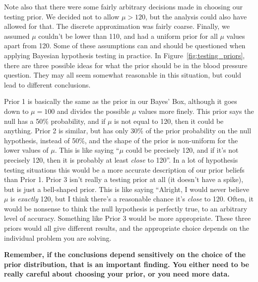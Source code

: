 Note also that there were some fairly arbitrary decisions made in choosing our
testing prior. We decided not to allow $\mu > 120$, but the analysis could
also have allowed for that. The discrete approximation was fairly coarse. Finally, we
assumed $\mu$ couldn't be lower than 110, and had a uniform prior for all
$\mu$ values apart from 120. Some of these assumptions can and should be
questioned when applying Bayesian hypothesis testing in practice.
In Figure~\ref{fig:testing_priors}, there are three possible ideas for what
the prior should be in the blood pressure question. They may all seem somewhat
reasonable in this situation, but could lead to different conclusions.

Prior 1 is basically the same as the prior in our Bayes' Box, although it goes
down to $\mu=100$ and divides the possible $\mu$ values more finely. This prior
says the null has a 50\% probability, and if $\mu$ is not equal to 120, then it
could be anything.
Prior 2
is similar, but has only 30\% of the prior probability on the null hypothesis,
instead of 50\%,
and the shape of the prior is non-uniform for the lower values of $\mu$.
This is like saying ``$\mu$ could be precisely 120, and if it's not precisely
120, then it is probably at least {\it close} to 120''. In a lot of hypothesis
testing situations this would be a more accurate description of our prior
beliefs than Prior 1.
Prior 3 isn't really a testing prior at all (it doesn't have a spike), but is
just a bell-shaped prior. This is like saying ``Alright, I would never believe
$\mu$ is {\it exactly} 120, but I think there's a reasonable chance it's {\it
close} to 120. Often, it would be nonsense to think the null hypothesis
is perfectly true, to an arbitrary level of accuracy. Something like Prior 3
would be more appropriate.
These three priors would all give different results, and the appropriate choice
depends on the individual problem you are solving. 

\begin{framed}
{\bf Remember, if the conclusions depend sensitively on the choice of the
prior distribution, that is an important finding. You either need to be
really careful about choosing your prior, or you need more data.}
\end{framed}

